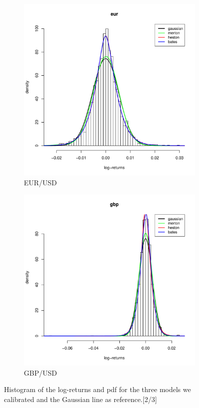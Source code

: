 \begin{figure}
\begin{subfigure}{0.44\textwidth}
	\centering
	\includegraphics[width=\linewidth]{Images/hist_eur.pdf}
	\caption{EUR/USD}
\end{subfigure}
\begin{subfigure}{0.44\textwidth}
	\centering
	\includegraphics[width=\linewidth]{Images/hist_gbp.pdf}
	\caption{GBP/USD}
\end{subfigure}

\caption{Histogram of the log-returns and pdf for the three models we calibrated and the Gaussian line as reference.[2/3]}
\label{fig:hist_2}
\end{figure}


